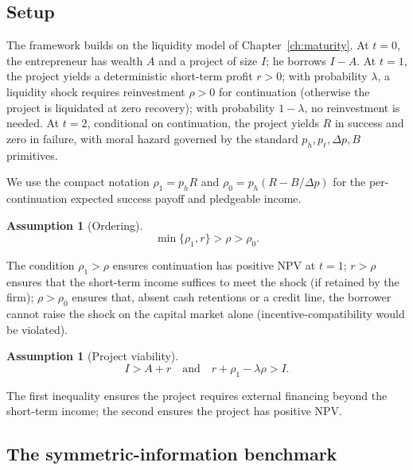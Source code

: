 \documentclass[11pt,a4paper,oneside]{book}
\theoremstyle{plain}
\theoremstyle{definition}
\newtheorem{assumption}[theorem]{Assumption}
\theoremstyle{remark}
\numberwithin{equation}{chapter}
\begin{document}
\subsection{Setup}

The framework builds on the liquidity model of Chapter~\ref{ch:maturity}.
At $t = 0$, the entrepreneur has wealth $A$ and a project of size $I$; he borrows $I - A$.
At $t = 1$, the project yields a deterministic short-term profit $r > 0$; with probability $\lambda$, a liquidity shock requires reinvestment $\rho > 0$ for continuation (otherwise the project is liquidated at zero recovery); with probability $1 - \lambda$, no reinvestment is needed.
At $t = 2$, conditional on continuation, the project yields $R$ in success and zero in failure, with moral hazard governed by the standard $p_h, p_\ell, \Delta p, B$ primitives.

We use the compact notation $\rho_1 = p_h R$ and $\rho_0 = p_h(R - B/\Delta p)$ for the per-continuation expected success payoff and pledgeable income.

\begin{assumption}[Ordering]\label{ass:diss-short-order}
\begin{equation*}
  \min\{\rho_1, r\} > \rho > \rho_0.
\end{equation*}
\end{assumption}

The condition $\rho_1 > \rho$ ensures continuation has positive NPV at $t = 1$; $r > \rho$ ensures that the short-term income suffices to meet the shock (if retained by the firm); $\rho > \rho_0$ ensures that, absent cash retentions or a credit line, the borrower cannot raise the shock on the capital market alone (incentive-compatibility would be violated).

\begin{assumption}[Project viability]\label{ass:diss-short-viability}
\begin{equation*}
  I > A + r
  \quad\text{and}\quad
  r + \rho_1 - \lambda \rho > I.
\end{equation*}
\end{assumption}

The first inequality ensures the project requires external financing beyond the short-term income; the second ensures the project has positive NPV.

\subsection{The symmetric-information benchmark}
\end{document}
